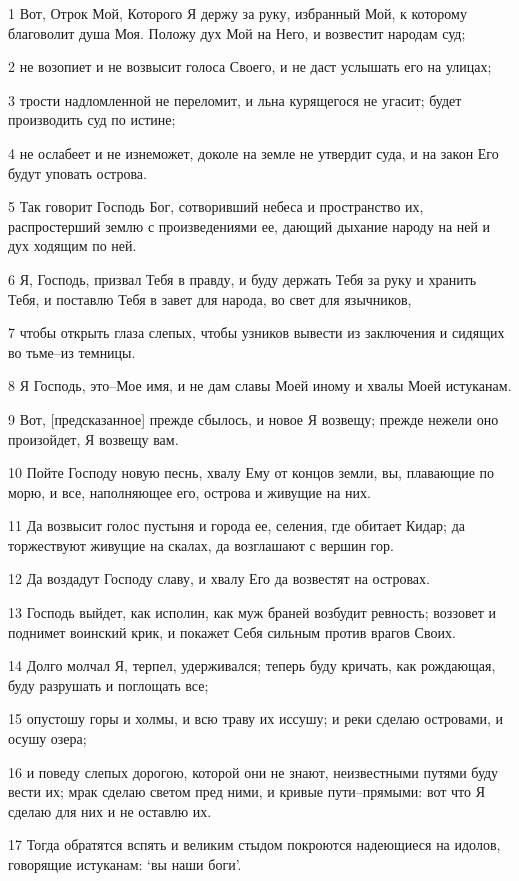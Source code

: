 \par 1 Вот, Отрок Мой, Которого Я держу за руку, избранный Мой, к которому благоволит душа Моя. Положу дух Мой на Него, и возвестит народам суд;
\par 2 не возопиет и не возвысит голоса Своего, и не даст услышать его на улицах;
\par 3 трости надломленной не переломит, и льна курящегося не угасит; будет производить суд по истине;
\par 4 не ослабеет и не изнеможет, доколе на земле не утвердит суда, и на закон Его будут уповать острова.
\par 5 Так говорит Господь Бог, сотворивший небеса и пространство их, распростерший землю с произведениями ее, дающий дыхание народу на ней и дух ходящим по ней.
\par 6 Я, Господь, призвал Тебя в правду, и буду держать Тебя за руку и хранить Тебя, и поставлю Тебя в завет для народа, во свет для язычников,
\par 7 чтобы открыть глаза слепых, чтобы узников вывести из заключения и сидящих во тьме--из темницы.
\par 8 Я Господь, это--Мое имя, и не дам славы Моей иному и хвалы Моей истуканам.
\par 9 Вот, [предсказанное] прежде сбылось, и новое Я возвещу; прежде нежели оно произойдет, Я возвещу вам.
\par 10 Пойте Господу новую песнь, хвалу Ему от концов земли, вы, плавающие по морю, и все, наполняющее его, острова и живущие на них.
\par 11 Да возвысит голос пустыня и города ее, селения, где обитает Кидар; да торжествуют живущие на скалах, да возглашают с вершин гор.
\par 12 Да воздадут Господу славу, и хвалу Его да возвестят на островах.
\par 13 Господь выйдет, как исполин, как муж браней возбудит ревность; воззовет и поднимет воинский крик, и покажет Себя сильным против врагов Своих.
\par 14 Долго молчал Я, терпел, удерживался; теперь буду кричать, как рождающая, буду разрушать и поглощать все;
\par 15 опустошу горы и холмы, и всю траву их иссушу; и реки сделаю островами, и осушу озера;
\par 16 и поведу слепых дорогою, которой они не знают, неизвестными путями буду вести их; мрак сделаю светом пред ними, и кривые пути--прямыми: вот что Я сделаю для них и не оставлю их.
\par 17 Тогда обратятся вспять и великим стыдом покроются надеющиеся на идолов, говорящие истуканам: `вы наши боги'.
